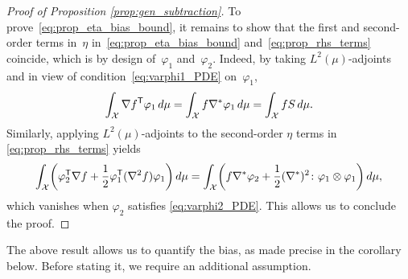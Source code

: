 \begin{proof}[Proof of Proposition \ref{prop:gen_subtraction}]
To prove~\eqref{eq:prop_eta_bias_bound}, it remains to show that the first and second-order terms in~$\eta$ in~\eqref{eq:prop_eta_bias_bound} and~\eqref{eq:prop_rhs_terms} coincide, which is by design of~$\varphi_1$ and~$\varphi_2$. Indeed, by taking $L^2(\mu)$-adjoints and in view of condition~\eqref{eq:varphi1_PDE} on~$\varphi_1$,
%
%
\begin{equation}
	\int_\mathcal{X} \nabla f^\mathsf T \varphi_1 \, d\mu = \int_\mathcal{X} f\nabla^* \varphi_1 \, d\mu = \int_\mathcal{X} f S \, d\mu.
\end{equation}
%
Similarly, applying $L^2(\mu)$-adjoints to the second-order $\eta$ terms in \eqref{eq:prop_rhs_terms} yields
%
\begin{align}
	\int_\mathcal{X} \paren*{\varphi_2^\t \nabla f + \frac{1}{2}\varphi_1^\t (\nabla^2f) \varphi_1} \, d\mu = \int_\mathcal{X} \paren*{f\nabla^*\varphi_2 + \frac{1}{2}(\nabla^*)^2 \colon \varphi_1\otimes \varphi_1} \, d\mu,
	\label{eq:eta2_term}
\end{align}
%
%
which vanishes when $\varphi_2$ satisfies \eqref{eq:varphi2_PDE}. This allows us to conclude the proof.
%
\begin{comment}
\begin{align}
	\int_\mathcal{X} \varphi_2^\t \nabla f \, d\mu = -\frac{1}{2}\int_\mathcal{X} \varphi_1^\t (\nabla^2f) \varphi_1 \, d\mu,%
	\label{eq:eta2_term}
\end{align}
%
which after integration by parts yields
%
\begin{align}
	\nabla^*\varphi_2 = -\frac{1}{2}(\nabla^*)^2 \colon \varphi_1\otimes \varphi_1 = -\frac{1}{2}\sum_{i,j=1}^d\partial_{x_i}^*\partial_{x_j}^* (\varphi_{1,i}\varphi_{1,j}),
\end{align}
%
which is precisely \eqref{eq:varphi2_PDE}. This allows us to conclude the proof.
\end{comment}
\end{proof}
%
%
The above result allows us to quantify the bias, as made precise in the corollary below. Before stating it, we require an additional assumption.


